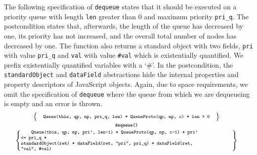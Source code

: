\documentclass{llncs}
\def\jsinline{\lstinline[language=JavaScript, basicstyle=\small]}
\begin{document}
The following specification of \jsinline|dequeue| states that it should be executed on a priority queue 
with length \jsinline|len| greater than $0$ and maximum priority \jsinline|pri_q|. 
The postcondition states that, afterwards, the length of the queue has
decreased by one, its priority has not increased, and the overall total number of nodes has decreased by one.
The function also returns a standard object with 
 two fields,   \jsinline|pri| with value \jsinline|pri_q| and \jsinline|val| with 
value \jsinline|#val|  which is existentially quantified. 
We prefix existentially quantified variables with a `\#'.
In the postcondition, the \jsinline|standardObject| and
\jsinline|dataField| abstractions  hide the internal properties and property descriptors of JavaScript objects.
Again, due
to space requirements, 
we omit the 
specification of \jsinline|dequeue| where the queue from which we are
dequeueing is empty and an error is thrown. 
%
\begin{displaymath} 
{\scriptsize
\hspace*{-0.2cm}
\begin{array}{c}
\left\{ 
{\begin{array}{c}
 \text{\texttt{ Queue(this, qp, np, pri\_q, len) * QueueProto(qp, np, c) * len > 0 }} 
\end{array}} \right\} \\[1.5mm]
\text{\bfseries \texttt{dequeue()}} \\[1mm]
\left\{ 
\begin{minipage}{0.88\textwidth}
\begin{verbatim}
    Queue(this, qp, np, pri', len-1) * QueueProto(qp, np, c-1) * pri' <= pri_q *
 standardObject(ret) * dataField(ret, "pri", pri_q) * dataField(ret, "val", #val)
\end{verbatim}
\end{minipage}\ \right\}
\end{array}}
\end{displaymath}
\end{document}
